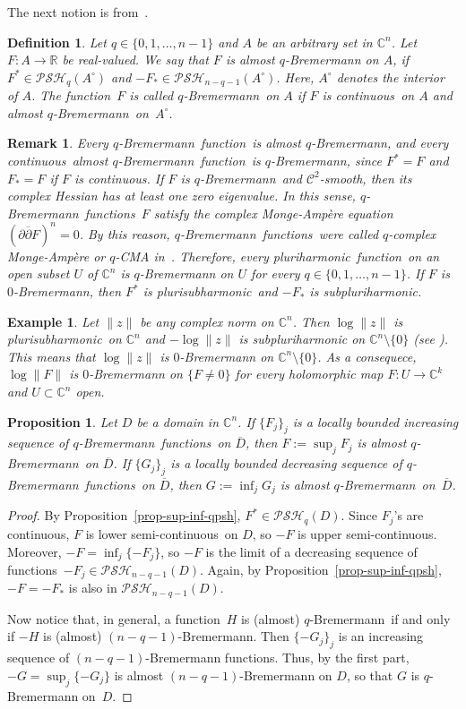 \documentclass[10pt,a4paper]{amsart}
\newtheorem{prop}[thm]{Proposition}
\newtheorem{defn}[thm]{Definition}
\newtheorem{ex}[thm]{Example}
\newtheorem{rem}[thm]{Remark}
\numberwithin{equation}{section}
\newcommand{\cbb}{\mathbb{C}}
\newcommand{\rbb}{\mathbb{R}}
\newcommand{\ccal}{\mathcal{C}}
\newcommand{\qbrem}{$q$-Bremermann}
\newcommand{\ph}{pluri\-harmonic}
\newcommand{\psh}{pluri\-sub\-harmonic}
\newcommand{\PSH}{\mathcal{PSH}}
\newcommand{\cl}[1]{\overline{#1}}
\newcommand{\cont}{continuous}
\newcommand{\usc}{upper semi-continuous}
\newcommand{\lsc}{lower semi-continuous}
\newcommand{\fct}{function}
\newcommand{\fcts}{functions}
\newcommand{\cld}{\overline{D}}
\begin{document}
The next notion is from~\cite{Sl84}. 

\begin{defn}\label{defqBrem} Let $q\in\{ 0,1,\ldots,n{-}1\}$ and $A$ be an arbitrary set in $\cbb^n$. Let $F:A\to\rbb$ be real-valued. We say that $F$ is \textit{almost \qbrem} on $A$, if $F^* \in \PSH_{q}(A^\circ)$ and $-F_* \in \PSH_{n-q-1}(A^\circ)$. Here, $A^\circ$ denotes the interior of $A$. The \fct\ $F$ is called \textit{\qbrem}\ on $A$ if $F$ is \cont\ on $A$ and almost \qbrem\ on~$A^\circ$.
\end{defn}

\begin{rem} Every \qbrem\ \fct\ is almost \qbrem, and every \cont\ almost \qbrem\ \fct\ is \qbrem, since $F^*=F$ and $F_*=F$ if $F$ is \cont. If $F$ is \qbrem\ and $\ccal^2$-smooth, then its complex Hessian has at least one zero eigenvalue. In this sense, \qbrem\ \fcts\ $F$ satisfy the complex Monge-Amp\`ere equation $(\partial\cl{\partial} F)^n=0$. By this reason, \qbrem\ \fcts\ were called \textit{$q$-complex Monge-Amp\`ere} or \textit{$q$-CMA} in~\cite{HM}. Therefore, every \ph\ \fct\ on an open subset $U$ of $\cbb^n$ is $q$-Bremermann on $U$ for every $q\in\{0,1,\ldots,n-1\}$. If $F$ is $0$-Bremermann, then $F^*$ is \psh\ and $-F_*$ is subpluriharmonic.
\end{rem}

\begin{ex} Let $\|z\|$ be any complex norm on $\cbb^n$. Then $\log\|z\|$ is \psh\ on $\cbb^n$ and $-\log\|z\|$ is subpluriharmonic on $\cbb^n\setminus\{0\}$ (see \cite{TPESZ}). This means that $\log\|z\|$ is $0$-Bremermann on $\cbb^n\setminus\{0\}$. As a consequece, $\log\|F\|$ is $0$-Bremermann on $\{F \neq 0\}$ for every holomorphic map $F:U \to \cbb^k$ and $U \subset \cbb^n$ open.
\end{ex}

\begin{prop}\label{prop-sup-inf-qbrem} Let $D$ be a domain in $\cbb^n$. If $\{F_j\}_j$ is a locally bounded increasing sequence of \qbrem\ \fcts\ on $\cld$, then $F:=\sup_j F_j$ is almost \qbrem\ on $\cld$. If $\{G_j\}_j$ is a locally bounded decreasing sequence of \qbrem\ \fcts\ on $\cld$, then $G:=\inf_j G_j$ is almost \qbrem\ on~$\cld$. 
\end{prop}

\begin{proof} By Proposition~\ref{prop-sup-inf-qpsh}, $F^* \in \PSH_q(D)$. Since $F_j$'s are \cont, $F$ is \lsc\ on $D$, so $-F$ is \usc. Moreover, $-F=\inf_j\{-F_j\}$, so $-F$ is the limit of a decreasing sequence of \fcts\ $-F_j \in \PSH_{n-q-1}(D)$. Again, by Proposition~\ref{prop-sup-inf-qpsh}, $-F=-F_*$ is also in $\PSH_{n-q-1}(D)$.

Now notice that, in general, a \fct\ $H$ is (almost) \qbrem\ if and only if $-H$ is (almost) $(n-q-1)$-Bremermann. Then $\{-G_j\}_j$ is an increasing sequence of $(n-q-1)$-Bremermann \fcts. Thus, by the first part, $-G=\sup_j\{-G_j\}$ is almost $(n-q-1)$-Bremermann on $D$, so that $G$ is $q$-Bremermann on~$D$.
\end{proof}
\end{document}
